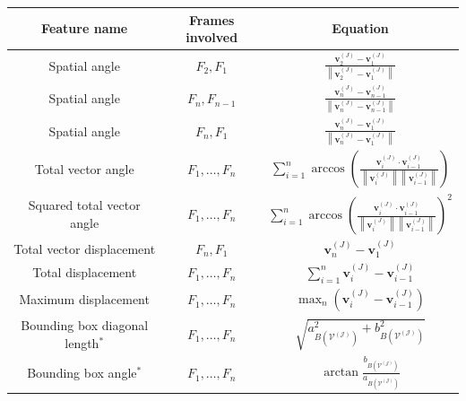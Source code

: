 \begin{frame}
\begin{columns}[T]
\begin{column}{.7\linewidth}
{    \begin{tabular}{|c|c|c|}
        \hline
         \textbf{Feature name}  & \textbf{Frames involved}  & \textbf{Equation}  \\ \hline
         Spatial angle          & $F_2, F_1$                  & $\displaystyle \frac{\mathbf{v}^{(J)}_{2} - \mathbf{v}^{(J)}_{1}}{\left\lVert \mathbf{v}^{(J)}_{2} - \mathbf{v}^{(J)}_{1} \right\rVert}$\\ \hline
         Spatial angle          & $F_n, F_{n-1}$              & $\displaystyle \frac{\mathbf{v}^{(J)}_{n} - \mathbf{v}^{(J)}_{n-1}}{\left\lVert \mathbf{v}^{(J)}_{n} - \mathbf{v}^{(J)}_{n-1} \right\rVert}$\\ \hline
         Spatial angle          & $F_n, F_{1}$              & $\displaystyle \frac{\mathbf{v}^{(J)}_{n} - \mathbf{v}^{(J)}_{1}}{\left\lVert \mathbf{v}^{(J)}_{n} - \mathbf{v}^{(J)}_{1} \right\rVert}$\\ \hline
         Total vector angle     & $F_1,\ldots, F_n$         & $\displaystyle \sum_{i=1}^n\arccos \left(\frac{\mathbf{v}^{(J)}_{i} \cdot \mathbf{v}^{(J)}_{i-1}}{\left\lVert \mathbf{v}^{(J)}_{i} \right\rVert \left\lVert \mathbf{v}^{(J)}_{i-1} \right\rVert}\right)$ \\ \hline
         Squared total vector angle     & $F_1,\ldots, F_n$         & $\displaystyle \sum_{i=1}^n\arccos \left(\frac{\mathbf{v}^{(J)}_{i} \cdot \mathbf{v}^{(J)}_{i-1}}{\left\lVert \mathbf{v}^{(J)}_{i} \right\rVert \left\lVert \mathbf{v}^{(J)}_{i-1} \right\rVert}\right)^2$ \\ \hline
         Total vector displacement      & $F_n, F_1$                &$\displaystyle \mathbf{v}^{(J)}_{n}-\mathbf{v}^{(J)}_{1}$ \\ \hline
         Total displacement             & $F_1,\ldots, F_n$         & $\displaystyle \sum_{i=1}^n{\mathbf{v}^{(J)}_{i} - \mathbf{v}^{(J)}_{i-1}}$ \\ \hline
         Maximum displacement & $F_1,\ldots, F_n$ & $\displaystyle \max_n\left(\mathbf{v}^{(J)}_{i}-\mathbf{v}^{(J)}_{i-1} \right)$ \\ \hline
         Bounding box diagonal length{$^*$}          & $F_1,\ldots, F_n$                  & $\displaystyle \sqrt{a_{B(\mathcal{V^{(J)}})}^2+b_{B(\mathcal{V^{(J)}})}^2}$\\ \hline
         Bounding box angle{$^*$}                 & $F_1,\ldots, F_n$                     & $\displaystyle \arctan{\frac{b_{B(\mathcal{V^{(J)}})}}{a_{B(\mathcal{V^{(J)}})}}}$ \\ \hline
    \end{tabular}
}
\end{column}

\end{columns}

\end{frame}


